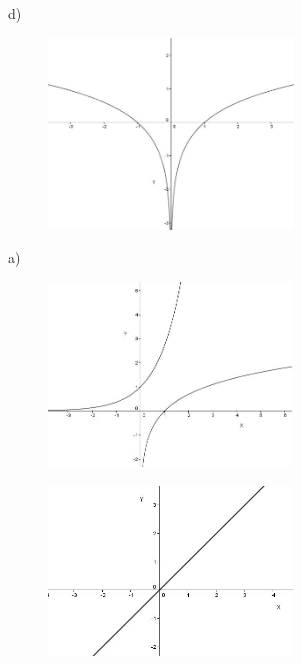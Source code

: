 \begin{respostas}{7}
d)

\begin{figure}[H]
	\begin{Center}
		\includegraphics[width=2.56in,height=2.0in]{capitulos/logaritmos_e_funcao_logaritmica/media/image22.jpeg}
	\end{Center}
\end{figure}

	\ansitem{} a)

    \begin{figure}[H]
	    \begin{Center}
	    	\includegraphics[width=2.54in,height=1.93in]{capitulos/logaritmos_e_funcao_logaritmica/media/image23.JPG}
	    \end{Center}
    \end{figure}

    \begin{figure}[H]
	    \begin{Center}
    		\includegraphics[width=2.55in,height=1.78in]{capitulos/logaritmos_e_funcao_logaritmica/media/image24.JPG}
    	\end{Center}
    \end{figure}


\end{respostas}
